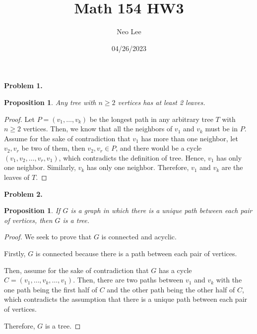 \documentclass{article}
\title{Math 154 HW3}
\author{Neo Lee}
\date{04/26/2023}
\newtheorem{prop}[thm]{Proposition}
\begin{document}
 

\maketitle 

\textbf{Problem 1.}
\begin{prop}
    Any tree with $n\ge 2$ vertices has at least 2 leaves.
\end{prop}
\begin{proof}
    Let $P = (v_1, \dots, v_k)$ be the longest path in any arbitrary tree $T$ with $n\ge 2$ vertices.  
    Then, we know that all the neighbors of $v_1$ and $v_k$ must be in $P$.
    Assume for the sake of contradiction that $v_1$ has more than one neighbor, let $v_2, v_r$ be two of them, then $v_2, v_r \in P$, and there would be a cycle $(v_1, v_2, \dots, v_r, v_1)$, which contradicts the definition of tree.
    Hence, $v_1$ has only one neighbor. Similarly, $v_k$ has only one neighbor.
    Therefore, $v_1$ and $v_k$ are the leaves of $T$.
\end{proof}
\bigbreak

\textbf{Problem 2.}
\begin{prop}
    If $G$ is a graph in which there is a unique path between each pair of vertices, then $G$ is a tree.
\end{prop}
\begin{proof}
    We seek to prove that $G$ is connected and acyclic.
    
    Firstly, $G$ is connected because there is a path between each pair of vertices.

    Then, assume for the sake of contradiction that $G$ has a cycle $C = (v_1, \dots, v_k, \dots, v_1)$.
    Then, there are two paths between $v_1$ and $v_k$ with the one path being the first half of $C$ and the other path being the other half of $C$, which contradicts the assumption that there is a unique path between each pair of vertices.

    Therefore, $G$ is a tree.
\end{proof}
\bigbreak
\end{document}
